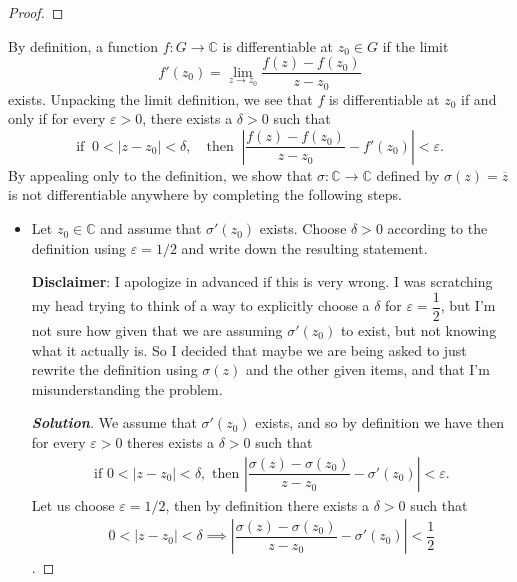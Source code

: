 \documentclass[11pt]{article}
\newenvironment{problem}[2][Problem\!]{\begin{trivlist}
\item[\hskip \labelsep {\bfseries #1}\hskip \labelsep {\bfseries #2}]}{\end{trivlist}}
\newenvironment{solution}{\begin{proof}[\textbf{\textit{Solution}}] }{\end{proof}}
\newcommand{\cc}{\mathbb C}   %
\newcommand{\abs}[1]{\left\lvert#1\right\rvert} %
\renewcommand{\epsilon}{\varepsilon}
\begin{document}
\begin{problem}{3.5}
\begin{itemize}[itemsep=3em]
\begin{proof}
\end{proof}

\end{itemize}
\end{problem}


\newpage

\begin{problem}{3.6}
By definition, a function $f : G \to \cc$ is differentiable at $z_0 \in G$ if the limit
\[f'(z_0) = \lim_{z\to z_0}\frac{f(z) - f(z_0)}{z - z_0}\]
exists. Unpacking the limit definition, we see that $f$ is differentiable at $z_0$ if and only if for every $\epsilon > 0$, there exists a $\delta > 0$ such that
\[\text{if }\ 0 < \abs{z - z_0} < \delta,\quad \text{then }\ \abs{\frac{f(z) - f(z_0)}{z - z_0} - f'(z_0)} < \epsilon.\]
By appealing only to the definition, we show that $\sigma : \cc \to \cc$ defined by $\sigma(z) = \overline{z}$ is not differentiable anywhere by completing the following steps.
\begin{itemize}[itemsep=3em]
\item[(i)] Let $z_0 \in \cc$ and assume that $\sigma'(z_0)$ exists. Choose $\delta > 0$ according to the definition using $\epsilon = 1/2$ and write down the resulting statement.

\textbf{Disclaimer}: I apologize in advanced if this is very wrong. I was scratching my head trying to think of a way to explicitly choose a $\delta$ for $\epsilon = \dfrac{1}{2}$, but I'm not sure how given that we are assuming $\sigma'(z_0)$ to exist, but not knowing what it actually is. So I decided that maybe we are being asked to just rewrite the definition using $\sigma(z)$ and the other given items, and that I'm misunderstanding the problem. 
\begin{solution}
  We assume that $\sigma'(z_0)$ exists, and so by definition we have then for every $\epsilon > 0$  theres exists a $\delta > 0$ such that
  \begin{align*}
    \text{if } 0 < \abs{z - z_0}< \delta, \text{     then }\abs{\dfrac{\sigma(z) - \sigma(z_0)}{z - z_0} - \sigma'(z_0)} < \epsilon.
  \end{align*}
  Let us choose $\epsilon = 1/2$, then by definition there exists a $\delta> 0$ such that
  \begin{align}
    0 < \abs{z - z_0}< \delta \implies \abs{\dfrac{\sigma(z) - \sigma(z_0)}{z - z_0} - \sigma'(z_0)} <\dfrac{1}{2}
  \end{align}.
\end{solution}


\end{itemize}
\end{problem}
\end{document}
